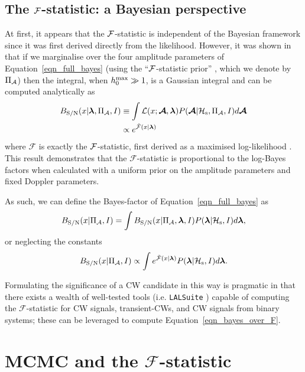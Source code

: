 \documentclass[aps, prd, twocolumn, superscriptaddress, floatfix, showpacs, nofootinbib, longbibliography]{revtex4-1}
\begin{document}
\subsection{The ${\mathcal{F}}$-statistic: a Bayesian perspective}

At first, it
appears that the ${\mathcal{F}}$-statistic is independent of the Bayesian framework since
it was first derived directly from the likelihood. However, it was shown in
\citet{prix2009, prix2011} that if we marginalise over the four amplitude parameters of
Equation~\eqref{eqn_full_bayes} (using the ``${\mathcal{F}}$-statistic prior'' \citep{prix2011},
which we denote by $\Pi_\mathcal{A}$)
then the integral, when $h_0^{\rm max} \gg 1$, is a Gaussian integral and can be
computed analytically as
\begin{align}
\begin{split}
B_{\rm S/N}(x| \boldsymbol{\mathbf{\lambda}}, \Pi_\mathcal{A}, I) & \equiv
\int
\mathcal{L}(x ;\boldsymbol{\mathcal{A}}, \boldsymbol{\mathbf{\lambda}})
P(\boldsymbol{\mathcal{A}}| \mathcal{H}_{\rm s}, \Pi_\mathcal{A}, I) d\boldsymbol{\mathcal{A}}
\label{eqn_B_S_N}
\\
& \propto e^{\tilde{{\mathcal{F}}}(x| \boldsymbol{\mathbf{\lambda}})}
\end{split}
\end{align}
where $\mathcal{F}$ is exactly the ${\mathcal{F}}$-statistic, first derived
as a maximised log-likelihood \citep{jks1998}. This result
demonstrates that the $\mathcal{F}$-statistic is proportional to the log-Bayes
factors when calculated with a uniform prior on the amplitude parameters and
fixed Doppler parameters.

As such, we can define the Bayes-factor of Equation~\eqref{eqn_full_bayes} as
\begin{equation}
B_{\rm S/N}(x| \Pi_\mathcal{A}, I) = \int
B_{\rm S/N}(x| \Pi_\mathcal{A}, \boldsymbol{\mathbf{\lambda}}, I) P(\boldsymbol{\mathbf{\lambda}}| \mathcal{H}_{\rm s}, I)
 d\boldsymbol{\mathbf{\lambda}},
\end{equation}
or neglecting the constants
\begin{equation}
B_{\rm S/N}(x| \Pi_\mathcal{A}, I) \propto \int
e^{\tilde{{\mathcal{F}}}(x| \boldsymbol{\mathbf{\lambda}})} P(\boldsymbol{\mathbf{\lambda}}| \mathcal{H}_{\rm s}, I)
 d\boldsymbol{\mathbf{\lambda}}.
\label{eqn_bayes_over_F}
\end{equation}

Formulating the significance of a CW candidate in this way is pragmatic in that
there exists a wealth of well-tested tools (i.e. \texttt{LALSuite}
\citep{lalsuite}) capable of computing the $\mathcal{F}$-statistic for CW
signals, transient-CWs, and CW signals from binary systems; these can be
leveraged to compute Equation~\eqref{eqn_bayes_over_F}.

\section{MCMC and the $\mathcal{F}$-statistic}
\label{sec_MCMC_and_the_F_statistic}
\end{document}

